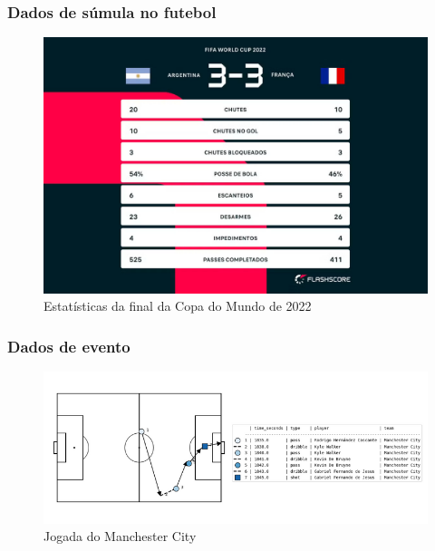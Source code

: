 \documentclass{beamer}
\begin{document}
\begin{frame}
\frametitle{Dados de súmula no futebol}
\begin{figure}[H]
\centering
\includegraphics[width=\linewidth]{copa.jpg}
\caption{Estatísticas da final da Copa do Mundo de 2022}
\end{figure}
\end{frame}

\begin{frame}
\frametitle{Dados de evento}
\begin{figure}[H]
\centering
\includegraphics[width=\linewidth]{eventdatacity.png}
\caption{Jogada do Manchester City}
\end{figure}
\end{frame}
\end{document}
